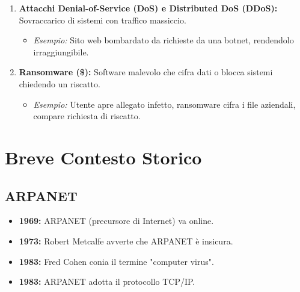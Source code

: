 \documentclass{article}
\begin{document}
\begin{enumerate}
\begin{itemize}
        \end{itemize}
    \item \textbf{Attacchi Denial-of-Service (DoS) e Distributed DoS (DDoS):} Sovraccarico di sistemi con traffico massiccio.
        \begin{itemize}
            \item \textit{Esempio:} Sito web bombardato da richieste da una botnet, rendendolo irraggiungibile.
        \end{itemize}
    \item \textbf{Ransomware (\$):} Software malevolo che cifra dati o blocca sistemi chiedendo un riscatto.
        \begin{itemize}
            \item \textit{Esempio:} Utente apre allegato infetto, ransomware cifra i file aziendali, compare richiesta di riscatto.
        \end{itemize}
\end{enumerate}

\section{Breve Contesto Storico}

\subsection{ARPANET}
\begin{itemize}
    \item \textbf{1969:} ARPANET (precursore di Internet) va online.
    \item \textbf{1973:} Robert Metcalfe avverte che ARPANET è insicura.
    \item \textbf{1983:} Fred Cohen conia il termine "computer virus".
    \item \textbf{1983:} ARPANET adotta il protocollo TCP/IP.
\end{itemize}
\end{document}
